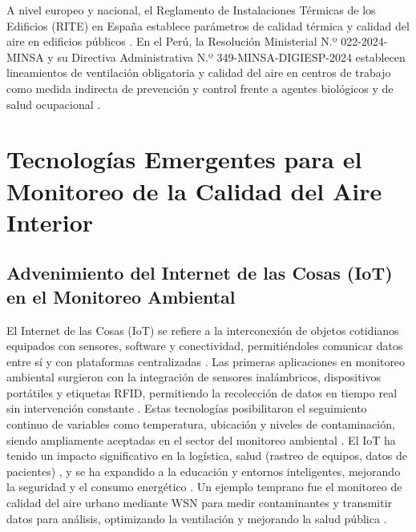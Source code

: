 A nivel europeo y nacional, el Reglamento de Instalaciones Térmicas de los Edificios (RITE) en España establece parámetros de calidad térmica y calidad del aire en edificios públicos \cite{teba_2021}. En el Perú, la Resolución Ministerial N.º 022-2024-MINSA y su Directiva Administrativa N.º 349-MINSA-DIGIESP-2024 establecen lineamientos de ventilación obligatoria y calidad del aire en centros de trabajo como medida indirecta de prevención y control frente a agentes biológicos y de salud ocupacional \cite{directiva_minsa}.

\section{Tecnologías Emergentes para el Monitoreo de la Calidad del Aire Interior}

\subsection{Advenimiento del Internet de las Cosas (IoT) en el Monitoreo Ambiental}
El Internet de las Cosas (IoT) se refiere a la interconexión de objetos cotidianos equipados con sensores, software y conectividad, permitiéndoles comunicar datos entre sí y con plataformas centralizadas \cite{contreras_perez_2020, The_Internet_of_Things_A_survey}. Las primeras aplicaciones en monitoreo ambiental surgieron con la integración de sensores inalámbricos, dispositivos portátiles y etiquetas RFID, permitiendo la recolección de datos en tiempo real sin intervención constante \cite{On_the_use_of_IoT_and_Big_Data_Technologies_for_Real_time_Monitoring_and_Data_Processing}. Estas tecnologías posibilitaron el seguimiento continuo de variables como temperatura, ubicación y niveles de contaminación, siendo ampliamente aceptadas en el sector del monitoreo ambiental \cite{mokolo_2022, IAQ_monitoring_systems_based_on_internet_of_things_a_systematic_review}. El IoT ha tenido un impacto significativo en la logística, salud (rastreo de equipos, datos de pacientes) \cite{The_Internet_of_Things_A_survey, the_application_of_internet_of_things_in_healthcare_a_systematic_literature_review_and_classification}, y se ha expandido a la educación y entornos inteligentes, mejorando la seguridad y el consumo energético \cite{On_the_use_of_IoT_and_Big_Data_Technologies_for_Real_time_Monitoring_and_Data_Processing}. Un ejemplo temprano fue el monitoreo de calidad del aire urbano mediante WSN para medir contaminantes y transmitir datos para análisis, optimizando la ventilación y mejorando la salud pública \cite{Developed_urban_air_quality_monitoring_system_based_on_wireless_sensor_networks}.

